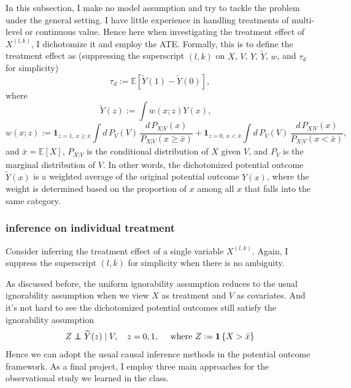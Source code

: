 \documentclass[11pt]{article}
\newcommand\indpt{\protect\mathpalette{\protect\indpT}{\perp}}
\def\indpT#1#2{\mathrel{\rlap{$#1#2$}\mkern2mu{#1#2}}}
\newcommand{\EE}{\mathbb{E}}
\newcommand{\one}{\mathbf{1}}
\newcommand{\tY}{\widetilde{Y}}
\newcommand{\br}[1]{\left[ #1 \right]}
\newcommand{\set}[1]{\left \{  #1 \right \}}
\begin{document}
In this subsection, I make no model assumption and try to tackle the problem under the general setting. I have little experience in handling treatments of multi-level or continuous value. Hence here when investigating the treatment effect of $X^{(l,k)}$, I dichotomize it and employ the ATE. Formally, this is to define the treatment effect as (suppressing the superscript $(l,k)$ on $X$, $V$, $Y$, $\tY$, $w$, and $\tau_d$ for simplicity)
\[ \tau_d := \EE \br{\tY(1) - \tY(0)}, \]
where
\[
    \tY(z) := \int w(x; z) Y(x), \quad
\]
\[ 
    w(x; z) := \one_{z=1, \, x \geq \bar x} \int d\,P_V(V) \, \frac{d \,P_{X|V}(x)}{P_{X|V}(x \geq \bar x)} + 
    \one_{z=0, \, x < \bar x} \int d\,P_V(V) \, \frac{d \,P_{X|V}(x)}{P_{X|V}(x < \bar x)},
\]
and $\bar x = \EE[X]$, $P_{X|V}$ is the conditional distribution of $X$ given $V$, and $P_V$ is the marginal distribution of $V$. In other words, the dichotomized potential outcome $\tY(x)$ is a weighted average of the original potential outcome $Y(x)$, where the weight is determined based on the proportion of $x$ among all $x$ that falls into the same category.

\subsubsection{inference on individual treatment}%
\label{subsub:causal_inference_for_individual_treatment}

Consider inferring the treatment effect of a single variable $X^{(l,k)}$. Again, I suppress the superscript $(l,k)$ for simplicity when there is no ambiguity.

As discussed before, the uniform ignorability assumption reduces to the usual ignorability assumption when we view $X$ as treatment and $V$ as covariates. And it's not hard to see the dichotomized potential outcomes still satisfy the ignorability assumption
\[
    Z \indpt \tY(z) \mid V, \quad z = 0,1, \quad
    \text{ where } Z := \one \set{X > \bar x}
\]
Hence we can adopt the usual causal inference methods in the potential outcome framework. As a final project, I employ three main approaches for the observational study we learned in the class.
\end{document}
